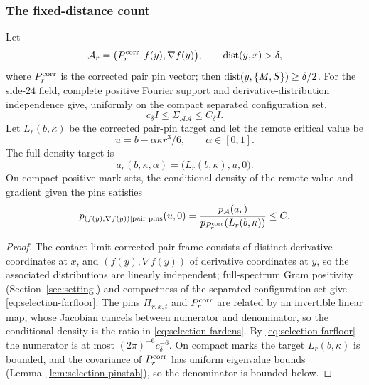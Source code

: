 \subsubsection{The fixed-distance count}

\begin{lemma}\label{lem:selection-farblock}
Let
\begin{equation}\label{eq:selection-farblock}
\mathcal A_r=\bigl(P^{\rm corr}_r,f(y),\nabla f(y)\bigr),\qquad\operatorname{dist}(y,x)>\delta,
\end{equation}
where $P^{\rm corr}_r$ is the corrected pair pin vector; then $\operatorname{dist}(y,\{M,S\})\ge\delta/2$. For the side-$24$ field, complete positive Fourier support and derivative-distribution independence give, uniformly on the compact separated configuration set,
\begin{equation}\label{eq:selection-farfloor}
c_\delta I\le\Sigma_{\mathcal A\mathcal A}\le C_\delta I .
\end{equation}
Let $L_r(b,\kappa)$ be the corrected pair-pin target and let the remote critical value be
\begin{equation}\label{eq:selection-farwindow}
u=b-\alpha\kappa r^3/6,\qquad\alpha\in[0,1].
\end{equation}
The full density target is
\begin{equation}\label{eq:selection-fartarget}
a_r(b,\kappa,\alpha)=\bigl(L_r(b,\kappa),u,0\bigr).
\end{equation}
On compact positive mark sets, the conditional density of the remote value and gradient given the pins satisfies
\begin{equation}\label{eq:selection-fardens}
p_{(f(y),\nabla f(y))\mid\text{pair pins}}(u,0)=\frac{p_{\mathcal A}(a_r)}{p_{P^{\rm corr}_r}(L_r(b,\kappa))}\le C .
\end{equation}
\end{lemma}

\begin{proof}
The contact-limit corrected pair frame consists of distinct derivative coordinates at $x$, and $(f(y),\nabla f(y))$ of derivative coordinates at $y$, so the associated distributions are linearly independent; full-spectrum Gram positivity (Section~\ref{sec:setting}) and compactness of the separated configuration set give \eqref{eq:selection-farfloor}. The pins $\Pi_{r,x,t}$ and $P^{\rm corr}_r$ are related by an invertible linear map, whose Jacobian cancels between numerator and denominator, so the conditional density is the ratio in \eqref{eq:selection-fardens}. By \eqref{eq:selection-farfloor} the numerator is at most $(2\pi)^{-6}c_\delta^{-6}$. On compact marks the target $L_r(b,\kappa)$ is bounded, and the covariance of $P^{\rm corr}_r$ has uniform eigenvalue bounds (Lemma~\ref{lem:selection-pinstab}), so the denominator is bounded below.
\end{proof}

